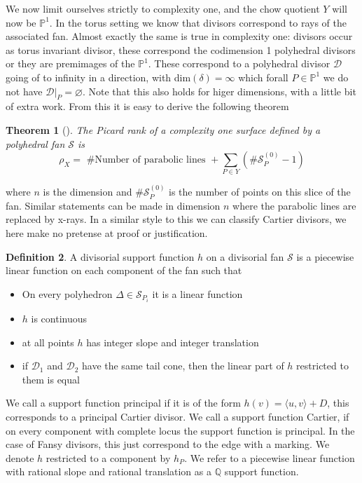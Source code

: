 \documentclass[12pt,a4paper]{book}      %
\newtheorem{thm}{Theorem}[section]
\theoremstyle{definition}
\newtheorem{dfn}[thm]{Definition}
\begin{document}
We now limit ourselves strictly to complexity one, and the chow quotient $Y$ will now be $\mathbb{P}^1$. In the torus setting we know that divisors correspond to rays of the associated fan. Almost exactly the same is true in complexity one: divisors  occur as torus invariant divisor, these correspond the codimension 1 polyhedral divisors or they are premimages of the $\mathbb{P}^1$. These correspond to a polyhedral divisor $\mathcal{D}$  going of to infinity in a direction, with dim$(\delta) = \infty$ which forall $P \in \mathbb{P}^1$ we do not have $\mathcal{D}  |_P = \varnothing$. Note that this also holds for higer dimensions, with a little bit of extra work. From this it is easy to derive the following theorem
\\
\begin{thm}[\cite{PS}]
The Picard rank of a complexity one surface defined by a polyhedral fan $\mathcal{S}$ is 
\[
\rho_X =  \text{ \# Number of parabolic lines } + \sum_{P \in Y} (\# \mathcal{S}_P^{(0)} - 1) 
\]
\end{thm}
where $n$ is the dimension and $\# \mathcal{S}_P^{(0)}$ is the number of points on this slice of the fan. Similar statements can be made in dimension $n$ where the parabolic lines are replaced by x-rays. In a similar style to this we can classify Cartier divisors, we here make no pretense at proof or justification. 
\begin{dfn}
A divisorial support function $h$ on a divisorial fan $\mathcal{S}$ is a piecewise linear function on each component of the fan such that

\begin{itemize}
\item On every polyhedron $\Delta \in \mathcal{S}_{P_i}$ it is a linear function
\item $h$ is continuous
\item at all points $h$ has integer slope and integer translation
\item if $\mathcal{D}_1$ and $\mathcal{D}_2$ have the same tail cone, then the linear part of $h$ restricted to them is equal
\end{itemize}
\end{dfn}
We call a support function principal if it is of the form $h(v) = \langle u, v \rangle + D$, this corresponds to a principal Cartier divisor. We call a support function Cartier, if on every component with complete locus the support function is principal. In the case of Fansy divisors, this just correspond to the edge with a marking. We denote $h$ restricted to a component by $h_P$.  We refer to a piecewise linear function with rational slope and rational translation as a $\mathbb{Q}$ support function.
\end{document}
